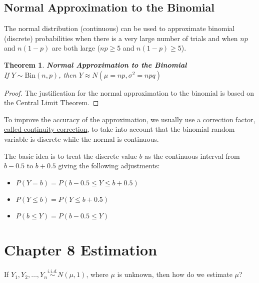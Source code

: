 \documentclass[a4paper,12pt]{article}
\theoremstyle{nonitalic}
\newtheorem{theorem}{Theorem}[subsection]
\begin{document}
    \subsection{Normal Approximation to the Binomial}

    The normal distribution (continuous) can be used to approximate binomial (discrete) probabilities when there is a very large number of trials and when \(np\) and \(n(1 - p)\) are both large (\(np \geq 5\) and \(n(1 - p) \geq 5\)).

    \bigskip

    \begin{theorem}
        \textbf{Normal Approximation to the Binomial}\\
        If \(Y \sim \text{Bin}(n,p)\), then \(Y \approx N(\mu = np, \sigma^2 = npq)\)
    \end{theorem}

    \begin{proof}
        The justification for the normal approximation to the binomial is based on the Central Limit Theorem.
    \end{proof}

    \bigskip
    
    To improve the accuracy of the approximation, we usually use a correction factor, \uline{called continuity correction}, to take into account that the binomial random variable is discrete while the normal is continuous.

    \bigskip

    The basic idea is to treat the discrete value \(b\) as the continuous interval from \(b - 0.5\) to \(b + 0.5\) giving the following adjustments:

    \begin{itemize}
        \item \(P(Y = b) = P(b - 0.5 \leq Y \leq b + 0.5)\)
        \item \(P(Y \leq b) = P(Y \leq b + 0.5)\)
        \item \(P(b \leq Y) = P(b - 0.5 \leq Y)\)
    \end{itemize}

    \newpage

    \section{Chapter 8 \textemdash{} Estimation}

    If \( Y_1, Y_2, \ldots, Y_n \overset{i.i.d.}{\sim} N(\mu, 1) \), where \(\mu\) is unknown, then how do we estimate \(\mu\)?
    
\end{document}
